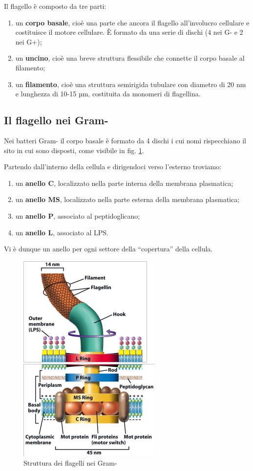 \documentclass[11pt]{book}
\begin{document}
\clearpage
Il flagello è composto da tre parti:
\begin{enumerate}
\item un \textbf{corpo basale}, cioè una parte che ancora il flagello all’involucro cellulare e costituisce il motore cellulare. È formato da una serie di dischi (4 nei G- e 2 nei G+);
\item un \textbf{uncino}, cioè una breve struttura flessibile che connette il corpo basale al filamento;
\item un \textbf{filamento}, cioè una struttura semirigida tubulare con diametro di 20 nm e lunghezza di 10-15 µm, costituita da monomeri di flagellina.
\end{enumerate}

\subsection{Il flagello nei Gram-} 
Nei batteri Gram- il corpo basale è formato da 4 dischi i cui nomi rispecchiano il sito in cui sono disposti, come visibile in fig. \ref{flagelli_gram-}.

Partendo dall’interno della cellula e dirigendoci verso l’esterno troviamo:
\begin{enumerate}
\item un \textbf{anello C}, localizzato nella parte interna della membrana plasmatica;
\item un \textbf{anello MS}, localizzato nella parte esterna della membrana plasmatica;
\item un \textbf{anello P}, associato al peptidoglicano;
\item un \textbf{anello L}, associato al LPS.
\end{enumerate}

Vi è dunque un anello per ogni settore della “copertura” della cellula.

\begin{figure}[htp]
\centering
\includegraphics[scale=0.66]{img/Flagello.png}
\caption{Struttura dei flagelli nei Gram-}
\label{flagelli_gram-}
\end{figure}
\end{document}
